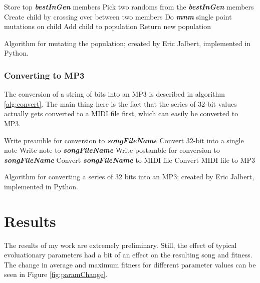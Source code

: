 \documentclass{article}
\begin{document}
\begin{algorithm}[h]
\dontprintsemicolon
{}
\Begin
{
  \SetLine
  Store top \textit{\textbf{bestInGen}} members\;
  {
    Pick two randoms from the \textit{\textbf{bestInGen}} members\; 
    Create child by crossing over between two members\;
    Do \textit{\textbf{mnm}} single point mutations on child\;
    Add child to population\;
  }
  Return new population\;
}
\caption{Algorithm for mutating the population; created by Eric Jalbert, implemented in Python.}
\label{alg:mutations}
\end{algorithm}


\subsubsection*{Converting to MP3}
The conversion of a string of bits into an MP3 is described in algorithm \ref{alg:convert}. The main thing here is the fact that the series of 32-bit values actually gets converted to a MIDI file first, which can easily be converted to MP3. 

\begin{algorithm}[h]
\dontprintsemicolon
{}
\Begin
{
  \SetLine
  Write preamble for conversion to \textit{\textbf{songFileName}}\;
  {
    Convert 32-bit into a single note\;
    Write note to \textit{\textbf{songFileName}}\;
  }
  Write postamble for conversion to \textit{\textbf{songFileName}}\;
  Convert \textit{\textbf{songFileName}} to MIDI file\;
  Convert MIDI file to MP3\;
}
\caption{Algorithm for converting a series of 32 bits into an MP3; created by Eric Jalbert, implemented in Python.}
\label{alg:convert}
\end{algorithm}


\section*{Results}
The results of my work are extremely preliminary. Still, the effect of typical evoluationary parameters had a bit of an effect on the resulting song and fitness. The change in average and maximum fitness for different parameter values can be seen in Figure \ref{fig:paramChange}. 
\end{document}
